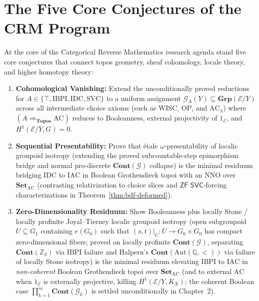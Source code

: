 \section{The Five Core Conjectures of the CRM Program}\label{sec:five-core-conjectures}

At the core of the Categorical Reverse Mathematics research agenda stand five core conjectures that connect topos geometry, sheaf cohomology, locale theory, and higher homotopy theory:

\begin{enumerate}

  \item \textbf{Cohomological Vanishing:} Extend the unconditionally proved reductions for $A \in \{\top, \mathrm{IBPI}, \mathrm{IDC}, \mathrm{SVC}\}$ to a uniform assignment $\mathcal{G}_A(Y) \subseteq \mathbf{Grp}(\mathcal{E}/Y)$ across all intermediate choice axioms (such as $\mathrm{WISC}$, $\mathrm{OP}$, and $\mathrm{AC}_\lambda$) where $(A \Rightarrow_{\mathbf{Topos}} \mathrm{AC})$ reduces to Booleanness, external projectivity of $1_{\mathcal{E}}$, and $H^1(\mathcal{E}/Y, G) = 0$.

  \item \textbf{Sequential Presentability:} Prove that \'etale $\omega$-presentability of localic groupoid isotropy (extending the proved subcountable-step epimorphism bridge and normal pro-discrete $\mathbf{Cont}(\mathcal{G})$ collapse) is the minimal residuum bridging $\mathrm{IDC}$ to $\mathrm{IAC}$ in Boolean Grothendieck topoi with an $\mathrm{NNO}$ over $\mathbf{Set}_{\mathrm{AC}}$ (contrasting relativization to choice slices and $\mathsf{ZF}$ $\mathsf{SVC}$-forcing characterizations in Theorem~\ref{thm:bdf-deformed}).

  \item \textbf{Zero-Dimensionality Residuum:} Show Booleanness plus locally Stone / locally profinite Joyal--Tierney localic groupoid isotropy (open subgroupoid $U \subseteq G_1$ containing $e(G_0)$ such that $(s, t)|_U : U \to G_0 \times G_0$ has compact zero-dimensional fibers; proved on locally profinite $\mathbf{Cont}(\mathcal{G})$, separating $\mathbf{Cont}(\mathbb{Z}_2)$ via $\mathrm{IBPI}$ failure and Halpern's $\mathbf{Cont}(\mathrm{Aut}(\mathbb{Q}, <))$ via failure of locally Stone isotropy) is the minimal residuum elevating $\mathrm{IBPI}$ to $\mathrm{IAC}$ in \emph{non-coherent} Boolean Grothendieck topoi over $\mathbf{Set}_{\mathrm{AC}}$ (and to external $\mathrm{AC}$ when $1_{\mathcal{E}}$ is externally projective, killing $H^1(\mathcal{E}/Y, K_X)$; the coherent Boolean case $\prod_{k=1}^m \mathbf{Cont}(\mathcal{G}_k)$ is settled unconditionally in Chapter~2).


\end{enumerate}
